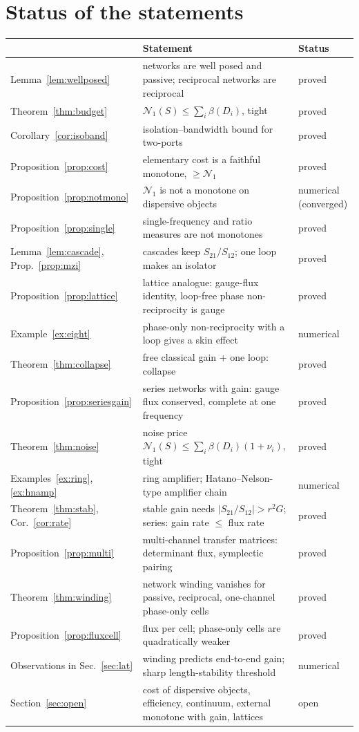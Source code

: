 \documentclass[11pt]{article}
\theoremstyle{definition}
\theoremstyle{remark}
\newcommand{\NN}{\mathcal N_1}
\begin{document}
\section{Status of the statements}

\begin{center}\small
\begin{tabularx}{\linewidth}{@{}l>{\raggedright\arraybackslash}Xl@{}}
\toprule
& Statement & Status\\
\midrule
Lemma~\ref{lem:wellposed} & networks are well posed and passive; reciprocal networks are reciprocal & proved\\
Theorem~\ref{thm:budget} & $\NN(S)\le\sum_i\beta(D_i)$, tight & proved\\
Corollary~\ref{cor:isoband} & isolation--bandwidth bound for two-ports & proved\\
Proposition~\ref{prop:cost} & elementary cost is a faithful monotone, $\ge\NN$ & proved\\
Proposition~\ref{prop:notmono} & $\NN$ is not a monotone on dispersive objects & numerical (converged)\\
Proposition~\ref{prop:single} & single-frequency and ratio measures are not monotones & proved\\
Lemma~\ref{lem:cascade}, Prop.~\ref{prop:mzi} & cascades keep $S_{21}/S_{12}$; one loop makes an isolator & proved\\
Proposition~\ref{prop:lattice} & lattice analogue: gauge-flux identity, loop-free phase non-reciprocity is gauge & proved\\
Example~\ref{ex:eight} & phase-only non-reciprocity with a loop gives a skin effect & numerical\\
Theorem~\ref{thm:collapse} & free classical gain + one loop: collapse & proved\\
Proposition~\ref{prop:seriesgain} & series networks with gain: gauge flux conserved, complete at one frequency & proved\\
Theorem~\ref{thm:noise} & noise price $\NN(S)\le\sum_i\beta(D_i)(1+\nu_i)$, tight & proved\\
Examples~\ref{ex:ring}, \ref{ex:hnamp} & ring amplifier; Hatano--Nelson-type amplifier chain & numerical\\
Theorem~\ref{thm:stab}, Cor.~\ref{cor:rate} & stable gain needs $|S_{21}/S_{12}|>r^2G$; series: gain rate $\le$ flux rate & proved\\
Proposition~\ref{prop:multi} & multi-channel transfer matrices: determinant flux, symplectic pairing & proved\\
Theorem~\ref{thm:winding} & network winding vanishes for passive, reciprocal, one-channel phase-only cells & proved\\
Proposition~\ref{prop:fluxcell} & flux per cell; phase-only cells are quadratically weaker & proved\\
Observations in Sec.~\ref{sec:lat} & winding predicts end-to-end gain; sharp length-stability threshold & numerical\\
Section~\ref{sec:open} & cost of dispersive objects, efficiency, continuum, external monotone with gain, lattices & open\\
\bottomrule
\end{tabularx}
\end{center}
\end{document}

